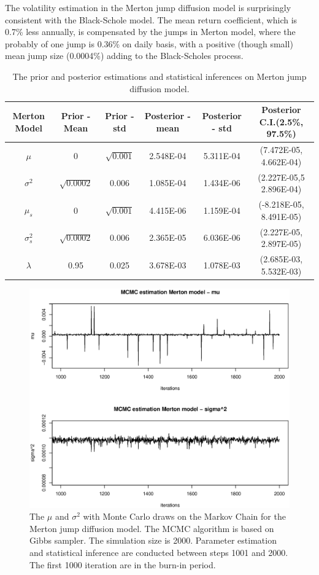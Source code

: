 \documentclass[11pt,reqno,final]{amsart}
\begin{document}
The volatility estimation in the Merton jump diffusion model is surprisingly consistent with the Black-Schole model. The mean return coefficient, which is 0.7\% less annually, is compensated by the jumps in Merton model, where the probably of one jump is 0.36\% on daily basis, with a positive (though small) mean jump size (0.0004\%) adding to the Black-Scholes process.

\begin{table}
\begin{center}
\caption{The prior and posterior estimations and statistical inferences on Merton jump diffusion model.}
\begin{tabular}{|c|c|c|c|c|c|}
  \hline
Merton Model	&	Prior - Mean	&	Prior - std	&	Posterior - mean	&	Posterior - std	&	Posterior C.I.(2.5\%, 97.5\%)	\\ \hline
$\mu$	&	0	&	$\sqrt{0.001}$	&	2.548E-04	&	5.311E-04	&	(7.472E-05, 4.662E-04)	\\
$\sigma^2$	&	$\sqrt{0.0002}$	&	0.006	&	1.085E-04	&	1.434E-06	&	(2.227E-05,5 2.896E-04)	\\
$\mu_s$	&	0	&	$\sqrt{0.001}$	&	4.415E-06	&	1.159E-04	&	(-8.218E-05,  8.491E-05)	\\
$\sigma_s^2$	&	$\sqrt{0.0002}$	&	0.006	&	2.365E-05	&	6.036E-06	&	(2.227E-05, 2.897E-05)	\\
$\lambda$	&	0.95	&	0.025	&	3.678E-03	&	1.078E-03	&	(2.685E-03, 5.532E-03)	\\
  \hline
\end{tabular}\label{tbl::merton_est}
\end{center}
\end{table}

\begin{figure} 
  \centering
  \includegraphics[scale=0.6]{merton_mu_sigma.eps}
  \caption{The $\mu$ and $\sigma^2$ with Monte Carlo draws on the Markov Chain for the Merton jump diffusion model. The MCMC algorithm is based on Gibbs sampler. The simulation size is 2000. Parameter estimation and statistical inference are conducted between steps 1001 and 2000. The first 1000 iteration are in the burn-in period.}\label{mu_sigma_merton}
\end{figure}
\end{document}
